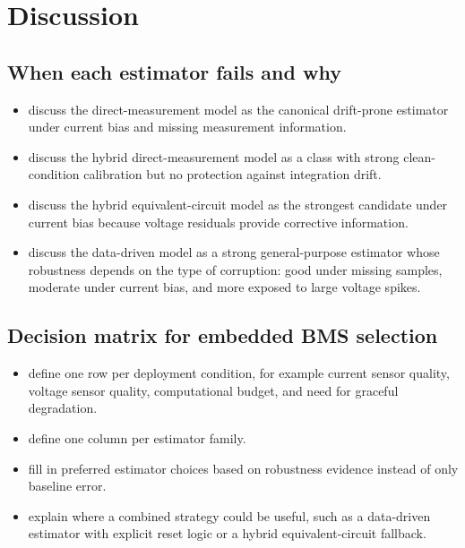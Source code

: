 \documentclass[review,nopreprintline]{elsarticle}
\begin{document}
\section{Discussion}
\subsection{When each estimator fails and why}
\begin{itemize}[leftmargin=*]
    \item discuss the direct-measurement model as the canonical drift-prone estimator under current bias and missing measurement information.
    \item discuss the hybrid direct-measurement model as a class with strong clean-condition calibration but no protection against integration drift.
    \item discuss the hybrid equivalent-circuit model as the strongest candidate under current bias because voltage residuals provide corrective information.
    \item discuss the data-driven model as a strong general-purpose estimator whose robustness depends on the type of corruption: good under missing samples, moderate under current bias, and more exposed to large voltage spikes.
\end{itemize}

\subsection{Decision matrix for embedded BMS selection}
\begin{itemize}[leftmargin=*]
    \item define one row per deployment condition, for example current sensor quality, voltage sensor quality, computational budget, and need for graceful degradation.
    \item define one column per estimator family.
    \item fill in preferred estimator choices based on robustness evidence instead of only baseline error.
    \item explain where a combined strategy could be useful, such as a data-driven estimator with explicit reset logic or a hybrid equivalent-circuit fallback.
\end{itemize}
\end{document}
